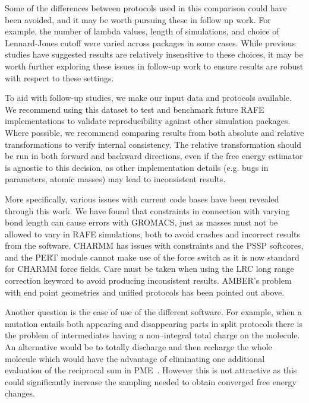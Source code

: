 \documentclass[journal=jctcce,manuscript=article]{achemso}
\begin{document}
Some of the differences between protocols used in this comparison could have been avoided, and it may be worth pursuing these in follow up work.
For example, the number of lambda values, length of simulations, and choice of Lennard-Jones cutoff were varied across packages in some cases.
While previous studies have suggested results are relatively insensitive to these choices, it may be worth further exploring these issues in follow-up work to ensure results are robust with respect to these settings.

To aid with follow-up studies, we make our input data and protocols available.  We recommend using this dataset to test and benchmark future RAFE implementations to validate reproducibility against other simulation packages.
Where possible, we recommend comparing results from both absolute and relative transformations to verify internal consistency.
The relative transformation should be run in both forward and backward directions, even if the free energy estimator is agnostic to this decision, as other implementation details (e.g. bugs in parameters, atomic masses) may lead to inconsistent results.

More specifically, various issues with current code bases have been revealed through this work.
We have found that constraints in connection with varying bond length can cause errors with GROMACS, just as masses must not be allowed to vary in RAFE simulations, both to avoid crashes and incorrect results from the
software.  CHARMM has issues with constraints and the PSSP softcores, and the PERT module cannot make use of the force switch as it is now standard for CHARMM force fields. Care must be taken when using the LRC long range correction keyword to avoid producing inconsistent results.  AMBER's problem with end point geometries and unified protocols has been pointed out above.

Another question is the ease of use of the different software.  For example, when a mutation entails both appearing and disappearing parts in split
protocols there is the problem of intermediates having a non--integral total
charge on the molecule.  An alternative would be to totally discharge and then
recharge the whole molecule which
would have the advantage of eliminating one additional evaluation of the reciprocal sum in PME~\cite{doi:10.1021/ct400340s}.
 However this is not attractive as this could significantly increase the sampling needed to obtain converged free energy changes.
\end{document}

